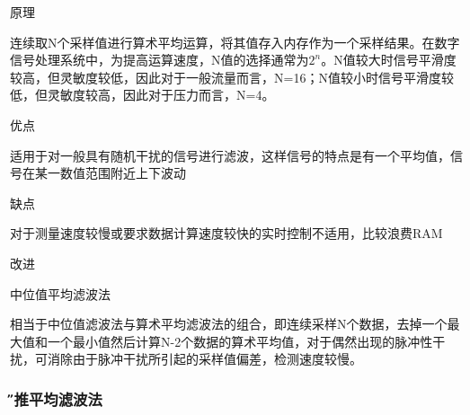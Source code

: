 \documentclass[12pt,a4paper]{article} %
\begin{document}
 		\begin{compactitem} 
 			\item 原理
 			\par 连续取N个采样值进行算术平均运算，将其值存入内存作为一个采样结果。在数字信号处理系统中，为提高运算速度，N值的选择通常为$2^n$。N值较大时信号平滑度较高，但灵敏度较低，因此对于一般流量而言，N=16；N值较小时信号平滑度较低，但灵敏度较高，因此对于压力而言，N=4。

			\item 优点
			\par 适用于对一般具有随机干扰的信号进行滤波，这样信号的特点是有一个平均值，信号在某一数值范围附近上下波动

			\item 缺点
			\par 对于测量速度较慢或要求数据计算速度较快的实时控制不适用，比较浪费RAM
			
			\item 改进
			\par 中位值平均滤波法
			\par 相当于中位值滤波法与算术平均滤波法的组合，即连续采样N个数据，去掉一个最大值和一个最小值然后计算N-2个数据的算术平均值，对于偶然出现的脉冲性干扰，可消除由于脉冲干扰所引起的采样值偏差，检测速度较慢。
			
			
		 \end{compactitem}	
 		
 		\subsubsection{\H 递推平均滤波法} 
 		
\end{document}

